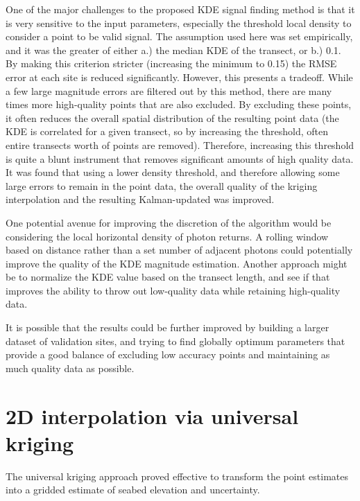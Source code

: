 One of the major challenges to the proposed KDE signal finding method is that it is very sensitive to the input parameters, especially the threshold local density to consider a point to be valid signal. The assumption used here was set empirically, and it was the greater of either a.) the median KDE of the transect, or b.) 0.1. By making this criterion stricter (increasing the minimum to 0.15) the RMSE error at each site is reduced significantly. However, this presents a tradeoff. While a few large magnitude errors are filtered out by this method, there are many times more high-quality points that are also excluded. By excluding these points, it often reduces the overall spatial distribution of the resulting point data (the KDE is correlated for a given transect, so by increasing the threshold, often entire transects worth of points are removed). Therefore, increasing this threshold is quite a blunt instrument that removes significant amounts of high quality data. It was found that using a lower density threshold, and therefore allowing some large errors to remain in the point data, the overall quality of the kriging interpolation and the resulting Kalman-updated was improved. 

One potential avenue for improving the discretion of the algorithm would be considering the local horizontal density of photon returns. A rolling window based on distance rather than a set number of adjacent photons could potentially improve the quality of the KDE magnitude estimation. Another approach might be to normalize the KDE value based on the transect length, and see if that improves the ability to throw out low-quality data while retaining high-quality data.

It is possible that the results could be further improved by building a larger dataset of validation sites, and trying to find globally optimum parameters that provide a good balance of excluding low accuracy points and maintaining as much quality data as possible.

\section{2D interpolation via universal kriging}

The universal kriging approach proved effective to transform the point estimates into a gridded estimate of seabed elevation and uncertainty. 

